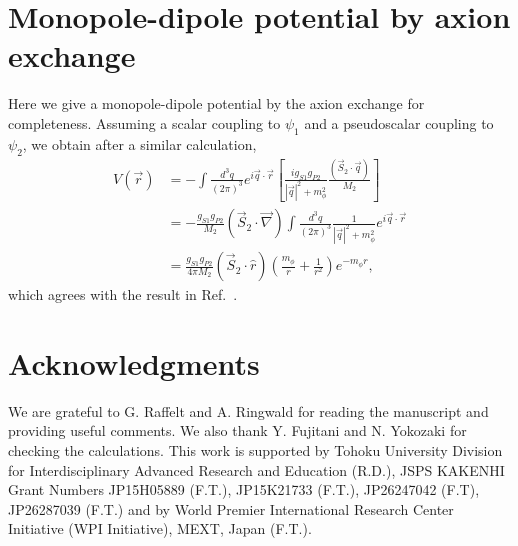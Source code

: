 \documentclass[12pt, a4paper]{article}
\begin{document}
\appendix
\section{Monopole-dipole potential by axion exchange}
Here we  give a monopole-dipole potential by the axion exchange for completeness. 
Assuming a scalar coupling to $\psi_1$ and a pseudoscalar coupling to $\psi_2$, we
obtain after a similar calculation, 
%
\begin{align}
V(\vec{r})&=-\int\frac{d^3q}{(2\pi)^3} e^{i\vec{q}\cdot\vec{r}} \left[
\frac{i g_{S1}g_{P2}}{|\vec{q}|^2+m_\phi^2}
\frac{(\vec{{S}}_2\cdot\vec{q})}{M_2}\right] 
\\
&=- \frac{g_{S1}g_{P2}}{M_2} (\vec{{S}}_2 \cdot \vec{\nabla})
\int\frac{d^3q}{(2\pi)^3}\frac{1}{|\vec{q}|^2+m_\phi^2} e^{i\vec{q}\cdot\vec{r}}\\
&=\frac{g_{S1}g_{P2}}{4 \pi M_2} (\vec{{S}}_2 \cdot \hat{r}) \left(\frac{m_\phi}{r}+\frac{1}{r^2}\right)
e^{-m_\phi r},
%
\end{align}
%
which agrees with the result in Ref.~\cite{Moody:1984ba}.

\section*{Acknowledgments}
We are grateful to G. Raffelt and A. Ringwald for reading the manuscript and providing useful comments.
We also thank Y. Fujitani and N. Yokozaki for checking the calculations. 
This work is supported by Tohoku University Division for Interdisciplinary Advanced Research and Education (R.D.),  JSPS KAKENHI Grant Numbers JP15H05889 (F.T.), JP15K21733 (F.T.), 
JP26247042 (F.T),  JP26287039 (F.T.) and by World Premier International Research 
Center Initiative (WPI Initiative), MEXT, Japan (F.T.).





\end{document}
